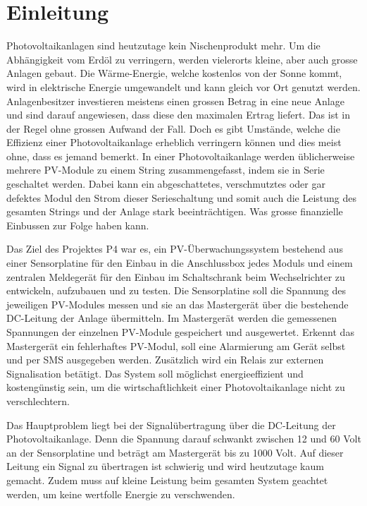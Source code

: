 \chapter{Einleitung}
\label{chap:einleitung}

Photovoltaikanlagen   sind  heutzutage   kein   Nischenprodukt  mehr. Um   die
Abh\"angigkeit vom Erd\"ol zu verringern,  werden vielerorts kleine, aber auch
grosse  Anlagen gebaut. Die  W\"arme-Energie, welche  kostenlos von  der Sonne
kommt, wird in elektrische Energie umgewandelt und kann gleich vor Ort genutzt
werden. Anlagenbesitzer  investieren meistens  einen  grossen  Betrag in  eine
neue  Anlage und  sind  darauf  angewiesen, dass  diese  den maximalen  Ertrag
liefert. Das  ist  in  der  Regel  ohne  grossen  Aufwand  der  Fall. Doch  es
gibt  Umst\"ande,  welche  die Effizienz  einer  Photovoltaikanlage  erheblich
verringern  k\"onnen  und  dies  meist  ohne,  dass  es  jemand  bemerkt.   In
einer  Photovoltaikanlage werden  \"ublicherweise mehrere  PV-Module zu  einem
String zusammengefasst, indem  sie in Serie geschaltet  werden. Dabei kann ein
abgeschattetes,  verschmutztes  oder  gar  defektes  Modul  den  Strom  dieser
Serieschaltung und somit auch die Leistung des gesamten Strings und der Anlage
stark  beeintr\"achtigen. Was grosse  finanzielle  Einbussen  zur Folge  haben
kann.

Das Ziel  des Projektes P4  war es, ein PV-\"Uberwachungssystem  bestehend aus
einer  Sensorplatine  f\"ur  den  Einbau  in  die  Anschlussbox  jedes  Moduls
und  einem  zentralen Meldeger\"at  f\"ur  den  Einbau im  Schaltschrank  beim
Wechselrichter zu entwickeln, aufzubauen und zu testen. Die Sensorplatine soll
die Spannung  des jeweiligen  PV-Modules messen und  sie an  das Masterger\"at
\"uber die  bestehende DC-Leitung  der Anlage  \"ubermitteln. Im Masterger\"at
werden  die  gemessenen Spannungen  der  einzelnen  PV-Module gespeichert  und
ausgewertet. Erkennt das  Masterger\"at ein  fehlerhaftes PV-Modul,  soll eine
Alarmierung am Ger\"at selbst und per SMS ausgegeben werden. Zus\"atzlich wird
ein Relais zur externen Signalisation bet\"atigt.  Das System soll m\"oglichst
energieeffizient  und kosteng\"unstig  sein, um  die wirtschaftlichkeit  einer
Photovoltaikanlage nicht zu verschlechtern.

Das Hauptproblem liegt  bei der Signal\"ubertragung \"uber  die DC-Leitung der
Photovoltaikanlage. Denn die Spannung darauf schwankt  zwischen 12 und 60 Volt
an  der Sensorplatine  und betr\"agt  am Masterger\"at  bis zu  1000 Volt. Auf
dieser Leitung  ein Signal zu  \"ubertragen ist schwierig und  wird heutzutage
kaum gemacht.   Zudem muss auf  kleine Leistung beim gesamten  System geachtet
werden, um keine wertfolle Energie zu verschwenden.

